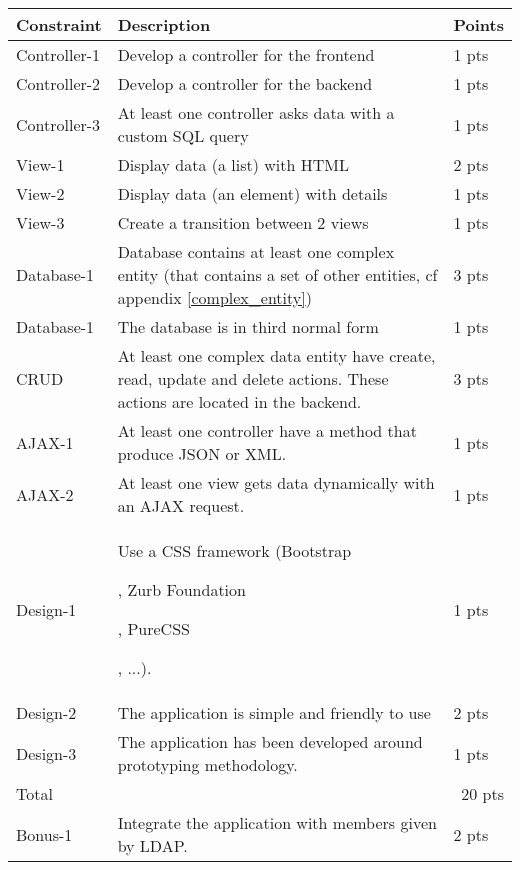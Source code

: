 \documentclass{article}         %
\newcounter{notetab}
\newcommand{\zero}{\setcounter{notetab}{0}}
\newcommand{\ntm}{\footnotemark\addtocounter{notetab}{1}}
\begin{document}
\zero
\begin{tabular}{|p{2cm}|p{10cm}|p{1cm}|}
  \hline
  Constraint & Description & Points \\

  \hline
  Controller-1 & Develop a controller for the frontend & 1 pts \\
  Controller-2 & Develop a controller for the backend & 1 pts \\
  Controller-3 & At least one controller asks data with a custom SQL query & 1 pts \\

  \hline
  View-1 & Display data (a list) with HTML & 2 pts \\
  View-2 & Display data (an element) with details & 1 pts \\
  View-3 & Create a transition between 2 views & 1 pts \\

  \hline
  Database-1 & Database contains at least one complex entity (that contains a set of other entities, cf appendix \ref{complex_entity}) & 3 pts \\
  Database-1 & The database is in third normal form \ntm & 1 pts \\

  \hline
  CRUD & At least one complex data entity have create, read, update and delete actions. These actions are located in the backend. & 3 pts \\

  \hline
  AJAX-1 & At least one controller have a method that produce JSON or XML. & 1 pts \\
  AJAX-2 & At least one view gets data dynamically with an AJAX request. & 1 pts \\

  \hline
  Design-1 & Use a CSS framework (Bootstrap\ntm, Zurb Foundation \ntm, PureCSS\ntm, ...). & 1 pts \\
  Design-2 & The application is simple and friendly to use & 2 pts \\
  Design-3 & The application has been developed around prototyping methodology. \ntm & 1 pts \\

  \hline
  Total & \multicolumn{2}{r|}{   20 pts \hspace{1 mm}} \\

  \hline
  Bonus-1 & Integrate the application with members given by LDAP. & 2 pts \\
  \hline
\end{tabular}
\end{document}
